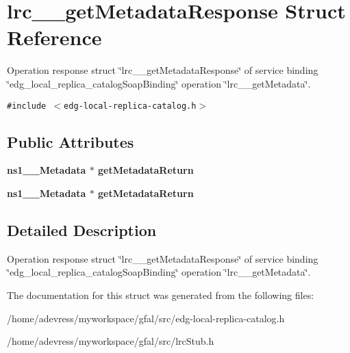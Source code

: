 \section{lrc\_\-\_\-get\-Metadata\-Response Struct Reference}
\label{structlrc____getMetadataResponse}
Operation response struct \char`\"{}lrc\_\-\_\-get\-Metadata\-Response\char`\"{} of service binding \char`\"{}edg\_\-local\_\-replica\_\-catalog\-Soap\-Binding\char`\"{} operation \char`\"{}lrc\_\-\_\-get\-Metadata\char`\"{}.  


{\tt \#include $<$edg-local-replica-catalog.h$>$}

\subsection*{Public Attributes}
\begin{CompactItemize}
\item 
\bf{ns1\_\-\_\-Metadata} $\ast$ \textbf{get\-Metadata\-Return}\label{structlrc____getMetadataResponse_84ca1102f9aeb0ebb420b79f15c6aa20}

\item 
\bf{ns1\_\-\_\-Metadata} $\ast$ \textbf{get\-Metadata\-Return}\label{structlrc____getMetadataResponse_84ca1102f9aeb0ebb420b79f15c6aa20}

\end{CompactItemize}


\subsection{Detailed Description}
Operation response struct \char`\"{}lrc\_\-\_\-get\-Metadata\-Response\char`\"{} of service binding \char`\"{}edg\_\-local\_\-replica\_\-catalog\-Soap\-Binding\char`\"{} operation \char`\"{}lrc\_\-\_\-get\-Metadata\char`\"{}. 



The documentation for this struct was generated from the following files:\begin{CompactItemize}
\item 
/home/adevress/myworkspace/gfal/src/edg-local-replica-catalog.h\item 
/home/adevress/myworkspace/gfal/src/lrc\-Stub.h\end{CompactItemize}
